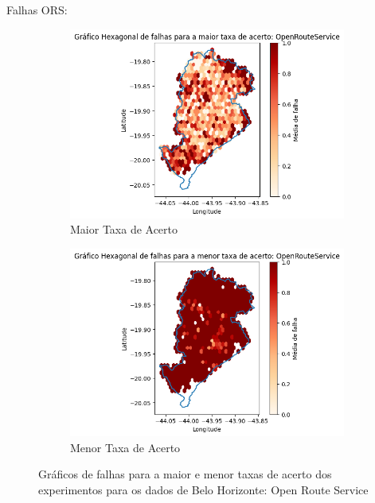 Falhas ORS:

\begin{figure}[ht]
  \centering
  \begin{subfigure}[b]{0.45\textwidth}
    \includegraphics[width=\textwidth]{Figuras/expFalhasORSmaior.png}
    \caption{Maior Taxa de Acerto}
    \label{fig:falhasorsBHexpMaior}
  \end{subfigure}
  \hfill
  \begin{subfigure}[b]{0.45\textwidth}
    \includegraphics[width=\textwidth]{Figuras/expFalhasORSmenor.png}
    \caption{Menor Taxa de Acerto}
    \label{fig:falhasorsBHexpMenor}
  \end{subfigure}
  
  \caption{Gráficos de falhas para a maior e menor taxas de acerto dos experimentos para os dados de Belo Horizonte: Open Route Service}
  \label{fig:falhas-exp-ors}
\end{figure}
